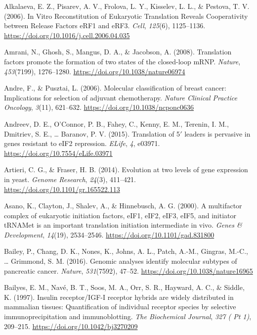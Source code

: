 \documentclass[12pt,openany]{book}
\begin{document}
\hypertarget{ref-Alkalaeva2006}{}
Alkalaeva, E. Z., Pisarev, A. V., Frolova, L. Y., Kisselev, L. L., \&
Pestova, T. V. (2006). In Vitro Reconstitution of Eukaryotic Translation
Reveals Cooperativity between Release Factors eRF1 and eRF3.
\emph{Cell}, \emph{125}(6), 1125--1136.
\url{https://doi.org/10.1016/j.cell.2006.04.035}

\hypertarget{ref-Amrani2008}{}
Amrani, N., Ghosh, S., Mangus, D. A., \& Jacobson, A. (2008).
Translation factors promote the formation of two states of the
closed-loop mRNP. \emph{Nature}, \emph{453}(7199), 1276--1280.
\url{https://doi.org/10.1038/nature06974}

\hypertarget{ref-Andre2006}{}
Andre, F., \& Pusztai, L. (2006). Molecular classification of breast
cancer: Implications for selection of adjuvant chemotherapy.
\emph{Nature Clinical Practice Oncology}, \emph{3}(11), 621--632.
\url{https://doi.org/10.1038/ncponc0636}

\hypertarget{ref-Andreev2015}{}
Andreev, D. E., O'Connor, P. B., Fahey, C., Kenny, E. M., Terenin, I.
M., Dmitriev, S. E., \ldots{} Baranov, P. V. (2015). Translation of
5\({'}\) leaders is pervasive in genes resistant to eIF2 repression.
\emph{ELife}, \emph{4}, e03971.
\url{https://doi.org/10.7554/eLife.03971}

\hypertarget{ref-Artieri2014}{}
Artieri, C. G., \& Fraser, H. B. (2014). Evolution at two levels of gene
expression in yeast. \emph{Genome Research}, \emph{24}(3), 411--421.
\url{https://doi.org/10.1101/gr.165522.113}

\hypertarget{ref-Asano2000}{}
Asano, K., Clayton, J., Shalev, A., \& Hinnebusch, A. G. (2000). A
multifactor complex of eukaryotic initiation factors, eIF1, eIF2, eIF3,
eIF5, and initiator tRNAMet is an important translation initiation
intermediate in vivo. \emph{Genes \& Development}, \emph{14}(19),
2534--2546. \url{https://doi.org/10.1101/gad.831800}

\hypertarget{ref-Bailey2016}{}
Bailey, P., Chang, D. K., Nones, K., Johns, A. L., Patch, A.-M.,
Gingras, M.-C., \ldots{} Grimmond, S. M. (2016). Genomic analyses
identify molecular subtypes of pancreatic cancer. \emph{Nature},
\emph{531}(7592), 47--52. \url{https://doi.org/10.1038/nature16965}

\hypertarget{ref-Bailyes1997b}{}
Bailyes, E. M., Navé, B. T., Soos, M. A., Orr, S. R., Hayward, A. C., \&
Siddle, K. (1997). Insulin receptor/IGF-I receptor hybrids are widely
distributed in mammalian tissues: Quantification of individual receptor
species by selective immunoprecipitation and immunoblotting. \emph{The
Biochemical Journal}, \emph{327 ( Pt 1)}, 209--215.
\url{https://doi.org/10.1042/bj3270209}
\end{document}
